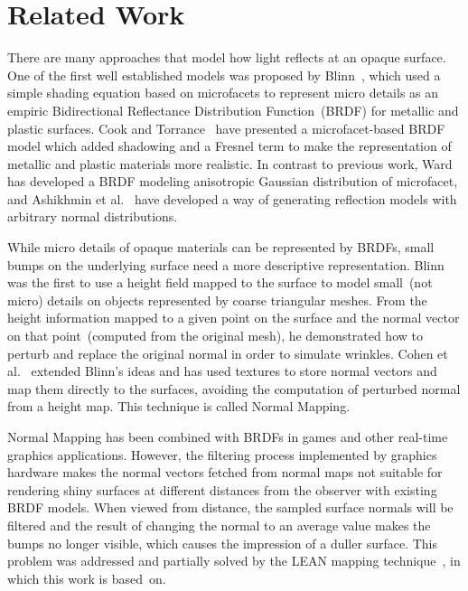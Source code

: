 \documentclass[10pt, conference]{IEEEtran}
\begin{document}
\section{Related Work}
\label{sec:related_work}
%
There are many approaches that model how light reflects at an opaque surface. One of the first well established models was proposed by Blinn~\cite{Blinn:1977:MLR:563858.563893}, which used a simple shading equation based on microfacets to represent micro details as an empiric Bidirectional Reflectance Distribution Function~(BRDF) for metallic and plastic surfaces. Cook and Torrance~\cite{Cook:1982:RMC:357290.357293} have presented a microfacet-based BRDF model which added shadowing and a Fresnel term to make the representation of metallic and plastic materials more realistic. In contrast to previous work, Ward~\cite{Ward:1992:MMA:133994.134078} has developed a BRDF modeling anisotropic Gaussian distribution of microfacet, and Ashikhmin et al.~\cite{Ashikmin:2000:MBG:344779.344814}  have developed a way of generating reflection models with arbitrary normal distributions.

While micro details of opaque materials can be represented by BRDFs, small bumps on the underlying surface need a more descriptive representation. Blinn~\cite{Blinn:1978:SWS:800248.507101} was the first to use a height field mapped to the surface to model small~(not micro) details on objects represented by coarse triangular meshes. From the height information mapped to a given point on the surface and the normal vector on that point~(computed from the original mesh), he demonstrated how to perturb and replace the original normal in order to simulate wrinkles. Cohen et al.~\cite{Cohen:1998:AS:280814.280832} extended Blinn's ideas and has used textures to store normal vectors and map them directly to the surfaces, avoiding the computation of perturbed normal from a height map. This technique is called Normal Mapping.

Normal Mapping has been combined with BRDFs in games and other real-time graphics applications. However, the filtering process implemented by graphics hardware makes the normal vectors fetched from normal maps not suitable for rendering shiny surfaces at different distances from the observer with existing BRDF models. When viewed from distance, the sampled surface normals will be filtered and the result of changing the normal to an average value makes the bumps no longer visible, which causes the impression of a duller surface. This problem was addressed and partially solved by the LEAN mapping technique~\cite{Olano:2010:LM:1730804.1730834}, in which this work is based~on.
\end{document}
